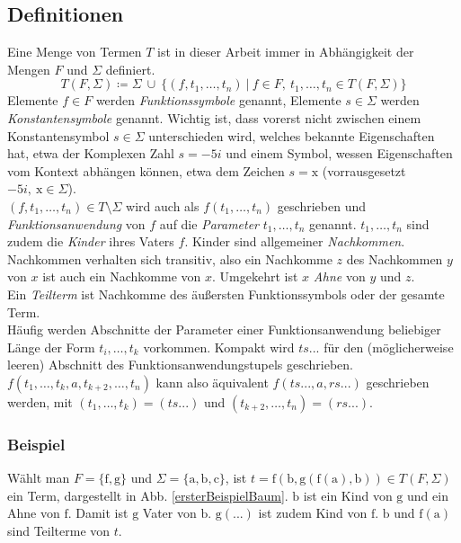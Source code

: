 \documentclass{article}
\begin{document}
\subsection{Definitionen}
Eine Menge von Termen $T$ ist in dieser Arbeit immer  in Abhängigkeit der Mengen $F$ und $\Sigma$ definiert.
$$T(F, \Sigma) \coloneqq \Sigma ~\cup~ \{
(f, t_1, \dots, t_n)
~|
~f\in F,
~ t_1, \dots,t_n \in T(F, \Sigma)
\}$$ 
Elemente $f\in F$ werden \textit{Funktionssymbole} genannt, Elemente $s \in \Sigma$ werden \textit{Konstantensymbole} genannt.
Wichtig ist, dass vorerst nicht zwischen einem Konstantensymbol $s \in \Sigma$ unterschieden wird, welches bekannte Eigenschaften hat, etwa der Komplexen Zahl $s = -5i$ und einem Symbol, wessen Eigenschaften vom Kontext abhängen können, etwa dem Zeichen $s = \mathrm x$ (vorrausgesetzt $-5i,~\mathrm x \in \Sigma$). \\
 $(f, t_1, \dots, t_n) \in T \setminus \Sigma$ wird auch als $f(t_1, \dots, t_n)$ geschrieben und \textit{Funktionsanwendung} von $f$ auf die \textit{Parameter} $t_1, \dots, t_n$ genannt. $t_1, \dots, t_n$ sind zudem die \emph{Kinder} ihres Vaters $f$. Kinder sind allgemeiner \textit{Nachkommen}. Nachkommen verhalten sich transitiv, also ein Nachkomme $z$ des Nachkommen $y$ von $x$ ist auch ein Nachkomme von $x$. Umgekehrt ist $x$ \textit{Ahne} von $y$ und $z$. \\
Ein \textit{Teilterm} ist Nachkomme des äußersten Funktionssymbols oder der gesamte Term. \\
Häufig werden Abschnitte der Parameter einer Funktionsanwendung beliebiger Länge der Form $t_i, \dots, t_k$ vorkommen. Kompakt wird $ts...$ für den (möglicherweise leeren) Abschnitt des Funktionsanwendungstupels geschrieben. \\$f(t_1, \dots, t_k, a, t_{k+2}, \dots, t_n)$ kann also äquivalent $f(ts..., a, rs...)$ geschrieben werden, mit $(t_1, \dots, t_k) = (ts...)$ und $(t_{k+2}, \dots, t_n) = (rs...)$.\\


\subsubsection{Beispiel}
Wählt man $F = \{\mathrm f, \mathrm g\}$ und $\Sigma = \{\mathrm a, \mathrm b, \mathrm c\}$, ist 
$t = \mathrm f(\mathrm b, \mathrm g(\mathrm f(\mathrm a), \mathrm b)) \in T(F, \Sigma)$ ein Term, dargestellt in Abb. \ref{ersterBeispielBaum}. $\mathrm b$ ist ein Kind von $\mathrm g$ und ein Ahne von $\mathrm f$. Damit ist $\mathrm g$ Vater von $\mathrm b$. $\mathrm g(...)$ ist zudem Kind von $\mathrm f$. $\mathrm b$ und $\mathrm f(\mathrm a)$ sind Teilterme von $t$.
\end{document}

